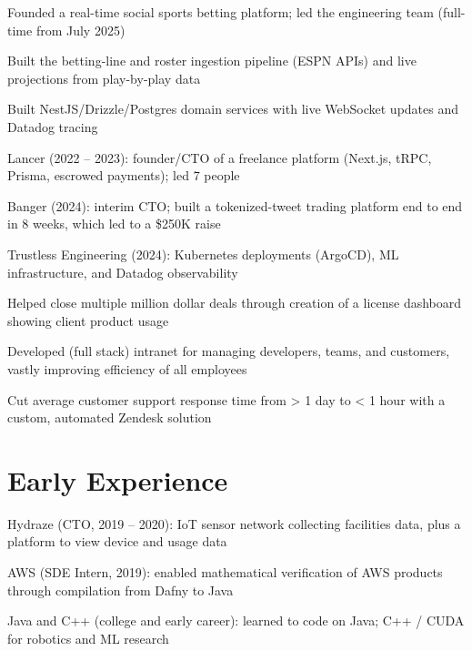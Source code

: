 \documentclass[print]{jack-resume}
\begin{document}
\begin{tightemize}
    \item Founded a real-time social sports betting platform; led the engineering team (full-time from July 2025)
    \item Built the betting-line and roster ingestion pipeline (ESPN APIs) and live projections from play-by-play data
    \item Built NestJS/Drizzle/Postgres domain services with live WebSocket updates and Datadog tracing
\end{tightemize}
\sectionsep

\begin{tightemize}
    \item Lancer (2022 -- 2023): founder/CTO of a freelance platform (Next.js, tRPC, Prisma, escrowed payments); led 7 people
    \item Banger (2024): interim CTO; built a tokenized-tweet trading platform end to end in 8 weeks, which led to a \$250K raise
    \item Trustless Engineering (2024): Kubernetes deployments (ArgoCD), ML infrastructure, and Datadog observability
\end{tightemize}
\sectionsep

\begin{tightemize}
    \item Helped close multiple million dollar deals through creation of a license dashboard showing client product usage
    \item Developed (full stack) intranet for managing developers, teams, and customers, vastly improving efficiency of all employees
    \item Cut average customer support response time from > 1 day to < 1 hour with a custom, automated Zendesk solution
\end{tightemize}
\sectionsep

\section{Early Experience}
\vspace{1.4em}
\begin{tightemize}
    \item Hydraze (CTO, 2019 -- 2020): IoT sensor network collecting facilities data, plus a platform to view device and usage data
    \item AWS (SDE Intern, 2019): enabled mathematical verification of AWS products through compilation from Dafny to Java
    \item Java and C++ (college and early career): learned to code on Java; C++ / CUDA for robotics and ML research
\end{tightemize}
\sectionsep
\end{document}
